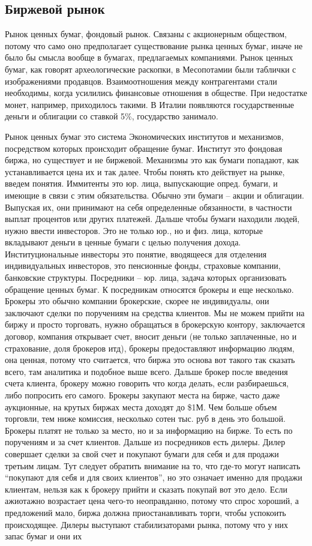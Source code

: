 \documentclass[a4paper, 12pt]{article}
\begin{document}
\subsection{Биржевой рынок}

Рынок ценных бумаг, фондовый рынок. Связаны с акционерным обществом, потому что само оно предполагает существование рынка ценных бумаг, иначе не было бы смысла вообще в бумагах, предлагаемых компаниями. Рынок ценных бумаг, как говорят археологические раскопки, в Месопотамии были таблички с изображениями продавцов. Взаимоотношения между контрагентами стали необходимы, когда усилились финансовые отношения в обществе. При недостатке монет, например, приходилось такими. 
В Италии появляются государственные деньги и облигации со ставкой 5\%, государство занимало. 

Рынок ценных бумаг это система Экономических институтов и механизмов, посредством которых происходит обращение бумаг. Институт это фондовая биржа, но существует и не биржевой. Механизмы это как бумаги попадают, как устанавливается цена их и так далее. Чтобы понять кто действует на рынке, введем понятия. Иммитенты это юр. лица, выпускающие опред. бумаги, и имеющие в связи с этим обязательства. Обычно эти бумаги -- акции и облигации. Выпуская их, они принимают на себя определенные обязанности, в частности выплат процентов или других платежей. Дальше чтобы бумаги находили людей, нужно ввести инвесторов. Это не только юр., но и физ. лица, которые вкладывают деньги в ценные бумаги с целью получения дохода. Институциональные инвесторы это понятие, вводящееся для отделения индивидуальных инвесторов, это пенсионные фонды, страховые компании, банковские структуры. Посредники -- юр. лица, задача которых организовать обращение ценных бумаг. К посредникам относятся брокеры и еще несколько. Брокеры это обычно компании брокерские, скорее не индивидуалы, они заключают сделки по поручениям на средства клиентов. Мы не можем прийти на биржу и просто торговать, нужно обращаться в брокерскую контору, заключается договор, компания открывает счет, вносит деньги (не только заплаченные, но и страхование, доля брокеров итд), брокеры предоставляют информацию людям, она ценная, потому что считается, что биржа это основа вот такого так сказать всего, там аналитика и подобное выше всего. Дальше брокер после введения счета клиента, брокеру можно говорить что когда делать, если разбираешься, либо попросить его самого. Брокеры закупают места на бирже, часто даже аукционные, на крутых биржах места доходят до \$1М. Чем больше объем торговли, тем ниже комиссия, несколько сотен тыс. руб в день это большой. Брокеры платят не только за место, но и за информацию на бирже. То есть по поручениям и за счет клиентов. Дальше из посредников есть дилеры. Дилер совершает сделки за свой счет и покупают бумаги для себя и для продажи третьим лицам. Тут следует обратить внимание на то, что где-то могут написать ``покупают для себя и для своих клиентов'', но это означает именно для продажи клиентам, нельзя как к брокеру прийти и сказать покупай вот это дело. Если ажиотажно возрастает цена чего-то неоправданно, потому что спрос хороший, а предложений мало, биржа должна приостанавливать торги, чтобы успокоить происходящее. Дилеры выступают стабилизаторами рынка, потому что у них запас бумаг и они их 
\end{document}
